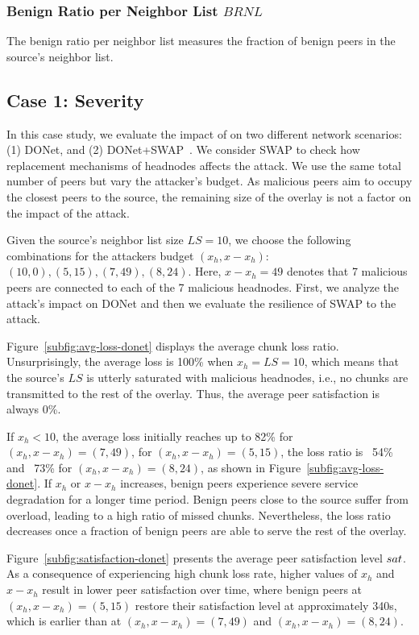 \subsubsection*{Benign Ratio per Neighbor List $BRNL$} The benign ratio per neighbor list measures the fraction of benign peers in the source's neighbor list.

\subsection{Case 1: \drop Severity}

In this case study, we evaluate the impact of \drop on two different network scenarios:  (1) DONet, and (2) DONet+SWAP~\cite{nguyen2016swap}. We consider SWAP to check how replacement mechanisms of headnodes affects the attack. 
We use the same total number of peers but vary the attacker's budget.
As malicious peers aim to occupy the closest peers to the source, the remaining size of the overlay is not a factor on the impact of the \drop attack.

Given the source's neighbor list size $LS=10$, we choose the following combinations for the attackers budget $(x_h, x-x_h)$: $(10,0), (5,15), (7,49), (8,24)$.
Here, $x-x_h=49$ denotes that 7 malicious peers are connected to each of the 7 malicious headnodes.
First, we analyze the attack's impact on DONet and then we evaluate the resilience of SWAP to the attack.

Figure~\ref{subfig:avg-loss-donet} displays the average chunk loss ratio.
Unsurprisingly, the average loss is 100\% when $x_h= LS =10$, which means that the source's $LS$ is utterly saturated with malicious headnodes, i.e., no chunks are transmitted to the rest of the overlay.
Thus, the average peer satisfaction is always 0\%. 

If $x_h < 10$, the average loss initially reaches up to 82\% for $(x_h, x-x_h)=(7, 49)$, for $(x_h, x-x_h)=(5, 15)$, the loss ratio is ~54\% and ~73\% for $(x_h, x-x_h)=(8, 24)$, as shown in Figure~\ref{subfig:avg-loss-donet}.
If $x_h$ or $x-x_h$ increases, benign peers experience severe service degradation for a longer time period. 
Benign peers close to the source suffer from overload, leading to a high ratio of missed chunks. 
Nevertheless, the loss ratio decreases once a fraction of benign peers are able to serve the rest of the overlay.

Figure~\ref{subfig:satisfaction-donet} presents the average peer satisfaction level $sat$.
As a consequence of experiencing high chunk loss rate, higher values of $x_h$ and $x-x_h$ result in lower peer satisfaction over time, where benign peers at $(x_h, x-x_h)=(5, 15)$ restore their satisfaction level at approximately 340s, which is earlier than at $(x_h, x-x_h)=(7, 49)$ and $(x_h, x-x_h)=(8, 24)$.

